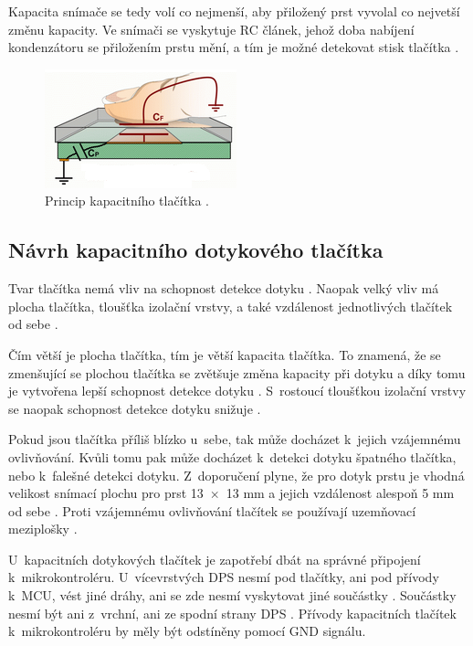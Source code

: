 Kapacita snímače se tedy volí co nejmenší, aby přiložený prst vyvolal co nejvetší změnu kapacity. Ve snímači se vyskytuje
RC článek, jehož doba nabíjení kondenzátoru se přiložením prstu mění, a tím je možné detekovat stisk tlačítka \cite{PrincipKapTl}. 

\begin{figure}[!h]
  \begin{center}
    \includegraphics[scale=1]{obrazky/kapacitni_princip.png}
  \end{center}
  \caption[Princip kapacitního tlačítka]{Princip kapacitního tlačítka \cite{PrincipKapTl}.}
\end{figure}

\subsection{Návrh kapacitního dotykového tlačítka}
Tvar tlačítka nemá vliv na schopnost detekce dotyku \cite{PrincipKapTl}. Naopak velký vliv má plocha tlačítka, tloušťka
izolační vrstvy, a také vzdálenost jednotlivých tlačítek od sebe \cite{PrincipKapTl}. 

Čím větší je plocha tlačítka, tím je větší kapacita tlačítka. To znamená, že se zmenšující se plochou tlačítka se zvětšuje změna kapacity 
při dotyku a díky tomu je vytvořena lepší schopnost detekce 
dotyku \cite{PrincipKapTl}. S~rostoucí tloušťkou izolační vrstvy se naopak schopnost detekce dotyku snižuje \cite{PrincipKapTl}.

Pokud jsou tlačítka příliš blízko u~sebe, tak může docházet k~jejich vzájemnému ovlivňování. Kvůli tomu pak může docházet
k~detekci dotyku špatného tlačítka, nebo k~falešné detekci dotyku. Z~doporučení plyne, že pro dotyk prstu je vhodná velikost snímací 
plochu pro prst 13~$\times$~13 mm a jejich vzdálenost alespoň 5 mm od sebe \cite{PrincipKapTl}. Proti vzájemnému ovlivňování tlačítek
se používají uzemňovací meziplošky \cite{PrincipKapTl}. 

U~kapacitních dotykových tlačítek je zapotřebí dbát na správné připojení k~mikrokontroléru. U~vícevrstvých DPS nesmí pod tlačítky, ani pod přívody
k~MCU, vést jiné dráhy, ani se zde nesmí vyskytovat jiné součástky \cite{PrincipKapTl}. Součástky nesmí být ani z~vrchní, ani ze spodní 
strany DPS \cite{PrincipKapTl}. Přívody kapacitních tlačítek k~mikrokontroléru by měly být odstíněny pomocí GND signálu.

